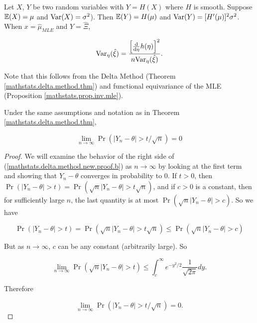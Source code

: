 \begin{theorem}

Let \(X\), \(Y\) be two random variables with \(Y = H(X)\) where \(H\) is smooth. Suppose \(\E(X) = \mu\) and \(\Var(X) = \sigma^2\)). Then \(\E(Y) = H(\mu)\) and \(\Var(Y) = [ H'(\mu)]^2 \sigma^2\). When \(x = \hat{\mu}_{MLE}\) and \(Y = \hat{\Xi}\), 

\[
\Var_\eta (\hat{\xi}) = \frac{ \left[  \deriv{}{\eta} h(\eta) \right]^2}{n \Var_\eta(\hat{\xi})}. 
\]

\end{theorem}

\begin{remark}

Note that this follows from the Delta Method (Theorem \ref{mathstats.delta.method.thm}) and functional equivariance of the MLE (Proposition \ref{mathstats.prop.inv.mle}). 

\end{remark}

\begin{lemma} Under the same assumptions and notation as in Theorem \ref{mathstats.delta.method.thm},

\[
\lim_{n \to \infty} \Pr(|Y_n - \theta| > t/\sqrt{n}) = 0
\] 

\end{lemma}

\begin{proof} We will examine the behavior of the right side of (\ref{mathstats.delta.method.new.proof.b}) as \(n \to \infty\) by looking at the first term and showing that \(Y_n - \theta\) converges in probability to 0. If \(t >0\), then \(\Pr(|Y_n - \theta| > t) = \Pr(\sqrt{n} |Y_n - \theta| > t \sqrt{n})\), and if \(c >0 \) is a constant, then for sufficiently large \(n\), the last quantity is at most \(\Pr(\sqrt{n} |Y_n - \theta| > c)\). So we have

\[
\Pr(|Y_n - \theta | > t) = \Pr(\sqrt{n} |Y_n - \theta | > t \sqrt{n}) \leq \Pr(\sqrt{n} |Y_n - \theta|  > c)
\]

But as \(n \to \infty\), \(c\) can be any constant (arbitrarily large). So

\[
\lim_{n \to \infty} \Pr(\sqrt{n}|Y_n - \theta  |> t) \leq \int_{c}^\infty e^{-y^2/2} \frac{1}{\sqrt{2 \pi}} dy.
\] 

Therefore

\[
\lim_{n \to \infty} \Pr(|Y_n - \theta| > t/\sqrt{n}) = 0.
\] 

\end{proof}

